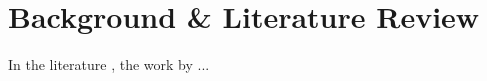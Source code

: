 \chapter{Background \& Literature Review} 
\label{Chapter2} 

In the literature \cite{ebrahim2018performance}, the work by \citet{ebrahim2018performance} ...